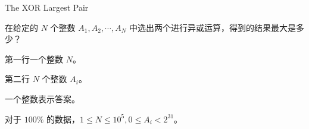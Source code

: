 The XOR Largest Pair

在给定的 $N$ 个整数 $A_1, A_2, \cdots, A_N$ 中选出两个进行异或运算，得到的结果最大是多少？

第一行一个整数 $N$。

第二行 $N$ 个整数 $A_i$。

一个整数表示答案。

对于 $100\%$ 的数据，$1\le N\le 10^5, 0\le A_i <2^{31}$。